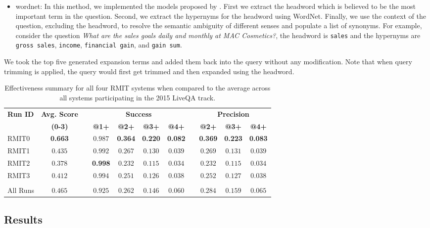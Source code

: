 \documentclass[a4paper,10pt,conference,compsocconf,final]{IEEEtran}
\newcommand\method[1]{{\sf\small{#1}}}
\begin{document}
{{{{\begin{itemize}
  \item \method{wordnet}: In this method, we implemented the models
  proposed by \cite{huang2008question, silva2011symbolic}.
  First we extract the headword which is believed to be the most
  important term in the question.
  Second, we extract the hypernyms for the headword using WordNet.
  Finally, we use the context of the question, excluding the
  headword, to resolve the semantic ambiguity of different senses and
  populate a list of synonyms.
  For example, consider the question \textit{What are the sales
  goals daily and monthly at MAC Cosmetics?}, the headword is
  {\tt sales} and the hypernyms are {\tt gross sales}, {\tt income},
  {\tt financial gain}, and {\tt gain sum}.
  \end{itemize}

We took the top five generated expansion terms and added them back into
the query without any modification.
Note that when query trimming is applied, the query would first get
trimmed and then expanded using the headword.


\begin{table*}[t]
\centering
\caption{
Effectiveness summary for all four RMIT systems when compared to the
average across all systems participating in the 2015 LiveQA track.
\label{tab:runs}}
\begin{tabular}{lcccccccccc}
\toprule
\multirow{2}{*}{\bf Run ID} & {\bf Avg. Score} && \multicolumn{4}{c}{\bf Success} && \multicolumn{3}{c}{\bf Precision} \\
& {\bf (0-3)} && {\bf @1+} & {\bf @2+} & {\bf @3+} & {\bf @4+} && {\bf @2+} & {\bf @3+} & {\bf @4+} \\
\midrule
RMIT0 &{\bf 0.663}&&$0.987$&{\bf 0.364}&{\bf 0.220}&{\bf 0.082}&&{\bf 0.369}&{\bf 0.223}&{\bf 0.083}\\
RMIT1 &$0.435$&&$0.992$&$0.267$&$0.130$&$0.039$&&$0.269$&$0.131$&$0.039$\\
RMIT2 &$0.378$&&{\bf 0.998}&$0.232$&$0.115$&$0.034$&&$0.232$&$0.115$&$0.034$\\
RMIT3 &$0.412$&&$0.994$&$0.251$&$0.126$&$0.038$&&$0.252$&$0.127$&$0.038$\\
&&&&&&&&&\\
All Runs  &$0.465$&&$0.925$&$0.262$&$0.146$&$0.060$&&$0.284$&$0.159$&$0.065$\\
\bottomrule
\end{tabular}
\end{table*}

\subsection{Results}

}}}}
\end{document}
